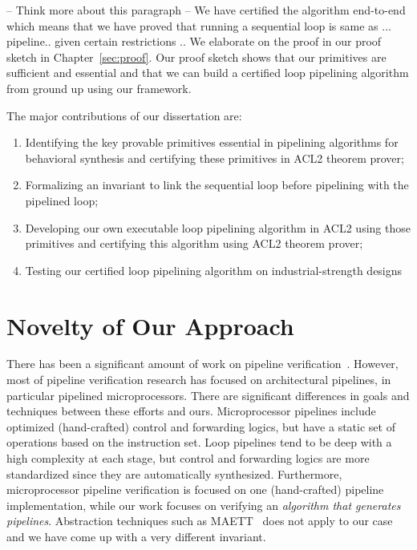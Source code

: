 -- Think more about this paragraph --
We have certified the algorithm end-to-end which means that we have proved that running a sequential loop is same as ... pipeline.. given certain restrictions ..  We elaborate on the proof in our proof sketch in Chapter~\ref{sec:proof}. Our proof sketch shows that our primitives are sufficient and essential and that we can build a certified loop pipelining algorithm from ground up using our framework.

The major contributions of our dissertation are:
\begin{enumerate}[--]
\item Identifying the key provable primitives essential in pipelining algorithms for behavioral synthesis and certifying these primitives in ACL2 theorem prover;
\item Formalizing an invariant to link the sequential loop before pipelining with the pipelined loop;
\item Developing our own executable loop pipelining algorithm in ACL2 using those primitives and certifying this algorithm using ACL2 theorem prover;
\item Testing our certified loop pipelining algorithm on industrial-strength designs
\end{enumerate}

\section {Novelty of Our Approach}
There has been a significant amount of work on pipeline
verification~\cite{bd:pipeline,sh:pipeline,pm:pipelines,velev05}.
However, most of pipeline verification research has focused
on architectural pipelines, in particular pipelined
microprocessors. There are significant differences in goals
and techniques between these efforts and ours.
Microprocessor pipelines include optimized (hand-crafted)
control and forwarding logics, but have a static set of
operations based on the instruction set.  Loop pipelines
tend to be deep with a high complexity at each stage, but
control and forwarding logics are more standardized since
they are automatically synthesized.  
Furthermore, microprocessor pipeline verification
is focused on one (hand-crafted) pipeline implementation,
while our work focuses on verifying an {\em algorithm
that generates pipelines}.  Abstraction techniques
such as MAETT~\cite{sh:pipeline} does not apply to our case
and we have come up with a very different invariant.

